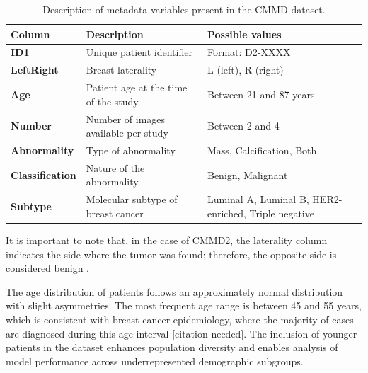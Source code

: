 \documentclass[a4paper,10pt]{book}
\begin{document}
\begin{table}[h]
	\caption[CMMD2 metadata description]{Description of metadata variables present in the CMMD dataset.}
	\centering
	\begin{tabular}{>{\bfseries}l p{5cm} p{6cm}}
		\toprule
		\textbf{Column} & \textbf{Description}                 & \textbf{Possible values}                             \\
		\midrule
		ID1             & Unique patient identifier            & Format: D2-XXXX                                      \\
		LeftRight       & Breast laterality                    & L (left), R (right)                                  \\
		Age             & Patient age at the time of the study & Between 21 and 87 years                              \\
		Number          & Number of images available per study & Between 2 and 4                                      \\
		Abnormality     & Type of abnormality                  & Mass, Calcification, Both                            \\
		Classification  & Nature of the abnormality            & Benign, Malignant                                    \\
		Subtype         & Molecular subtype of breast cancer   & Luminal A, Luminal B, HER2-enriched, Triple negative \\
		\bottomrule
	\end{tabular}

	\label{tab:cmmd2_metadata}
\end{table}

It is important to note that, in the case of CMMD2, the laterality column indicates the side where the tumor was found; therefore, the opposite side is considered benign \cite{cai_online_2023}.

The age distribution of patients follows an approximately normal distribution with slight asymmetries. The most frequent age range is between 45 and 55 years, which is consistent with breast cancer epidemiology, where the majority of cases are diagnosed during this age interval [citation needed]. The inclusion of younger patients in the dataset enhances population diversity and enables analysis of model performance across underrepresented demographic subgroups.
\end{document}
